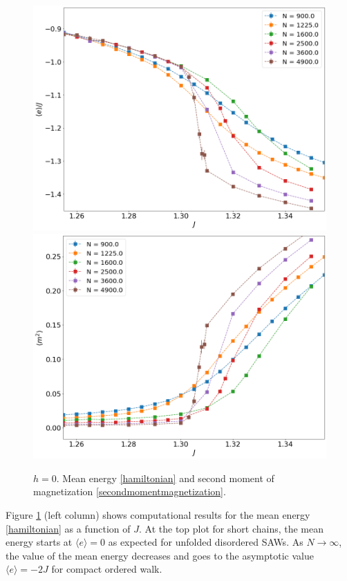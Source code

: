 \begin{figure}[t]
	\includegraphics[scale=0.23]{Images/energy_longchains.png}
	\includegraphics[scale=0.23]{Images/magnetization2_longchains.png}
	\caption{$h=0$. Mean energy \eqref{hamiltonian} and   second moment of magnetization \eqref{secondmomentmagnetization}. }
	\label{fig:energymagshort}
\end{figure}

 Figure \ref{fig:energymagshort} (left column) shows computational results for the mean energy  \eqref{hamiltonian} as a function of $J$. At the top plot for short chains, the mean energy starts at $\langle e \rangle = 0$ as expected for unfolded disordered SAWs. As $N \rightarrow \infty$, the value of the mean energy decreases and goes to the asymptotic value $\langle e \rangle = -2J$ for compact ordered walk. 
 
